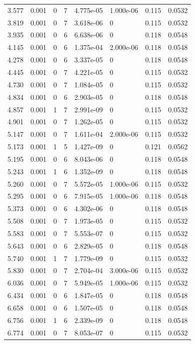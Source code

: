 \documentclass[preview]{standalone}
\begin{document}
{{\begin{tabular}{L{1.2cm}C{1.2cm} C{0.3cm}C{0.5cm} C{1.4cm}C{1.4cm} C{1.4cm}C{1.4cm}}
  3.577  &  0.001  & 0     &  7 &  4.775e-05  & 1.000e-06  & 0.115 &  0.0532   \\ 
  3.819  &  0.001  & 0     &  7 &  3.618e-06  & 0  & 0.115 &  0.0532   \\ 
  3.935  &  0.001  & 0     &  6 &  6.638e-06  & 0  & 0.118 &  0.0548   \\ 
  4.145  &  0.001  & 0     &  6 &  1.375e-04  & 2.000e-06  & 0.118 &  0.0548   \\ 
  4.278  &  0.001  & 0     &  6 &  3.337e-05  & 0  & 0.118 &  0.0548   \\ 
  4.445  &  0.001  & 0     &  7 &  4.221e-05  & 0  & 0.115 &  0.0532   \\ 
  4.730  &  0.001  & 0     &  7 &  1.084e-05  & 0  & 0.115 &  0.0532   \\ 
  4.834  &  0.001  & 0     &  6 &  2.903e-05  & 0  & 0.118 &  0.0548   \\ 
  4.857  &  0.001  & 1     &  7 &  2.991e-09  & 0  & 0.115 &  0.0532   \\ 
  4.901  &  0.001  & 0     &  7 &  1.262e-05  & 0  & 0.115 &  0.0532   \\ 
  5.147  &  0.001  & 0     &  7 &  1.611e-04  & 2.000e-06  & 0.115 &  0.0532   \\ 
  5.173  &  0.001  & 1     &  5 &  1.427e-09  & 0  & 0.121 &  0.0562   \\ 
  5.195  &  0.001  & 0     &  6 &  8.043e-06  & 0  & 0.118 &  0.0548   \\ 
  5.243  &  0.001  & 1     &  6 &  1.352e-09  & 0  & 0.118 &  0.0548   \\ 
  5.260  &  0.001  & 0     &  7 &  5.572e-05  & 1.000e-06  & 0.115 &  0.0532   \\ 
  5.295  &  0.001  & 0     &  6 &  7.915e-05  & 1.000e-06  & 0.118 &  0.0548   \\ 
  5.373  &  0.001  & 0     &  6 &  4.302e-06  & 0  & 0.118 &  0.0548   \\ 
  5.508  &  0.001  & 0     &  7 &  1.973e-05  & 0  & 0.115 &  0.0532   \\ 
  5.583  &  0.001  & 0     &  7 &  5.553e-07  & 0  & 0.115 &  0.0532   \\ 
  5.643  &  0.001  & 0     &  6 &  2.829e-05  & 0  & 0.118 &  0.0548   \\ 
  5.740  &  0.001  & 1     &  7 &  1.779e-09  & 0  & 0.115 &  0.0532   \\ 
  5.830  &  0.001  & 0     &  7 &  2.704e-04  & 3.000e-06  & 0.115 &  0.0532   \\ 
  6.036  &  0.001  & 0     &  7 &  5.949e-05  & 1.000e-06  & 0.115 &  0.0532   \\ 
  6.434  &  0.001  & 0     &  6 &  1.847e-05  & 0  & 0.118 &  0.0548   \\ 
  6.658  &  0.001  & 0     &  6 &  1.507e-05  & 0  & 0.118 &  0.0548   \\ 
  6.756  &  0.001  & 1     &  6 &  2.339e-09  & 0  & 0.118 &  0.0548   \\ 
  6.774  &  0.001  & 0     &  7 &  8.053e-07  & 0  & 0.115 &  0.0532   \\ 
\hline 
\end{tabular} 

}}
\end{document}
